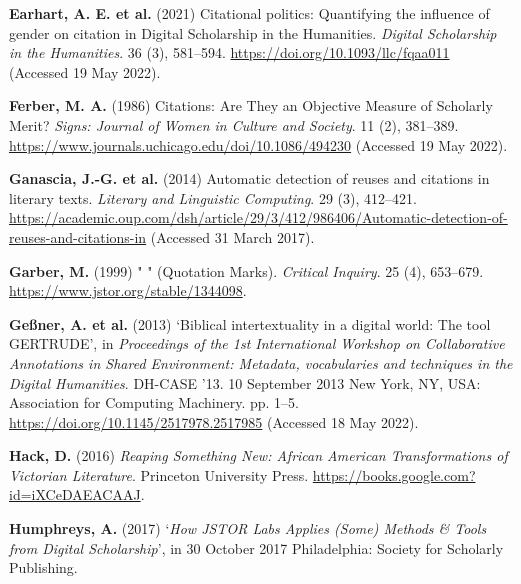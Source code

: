 \documentclass[
]{article}
\newlength{\cslhangindent}
\newlength{\cslentryspacingunit} %
\newenvironment{CSLReferences}[2] %
 {%
  \setlength{\parindent}{0pt}
  \ifodd #1
  \let\oldpar\par
  \def\par{\hangindent=\cslhangindent\oldpar}
  \fi
  \setlength{\parskip}{#2\cslentryspacingunit}
 }%
 {}
\begin{document}
\begin{CSLReferences}{1}{0}
\leavevmode{}%
\textbf{Earhart, A. E. et al.} (2021) Citational politics: {Quantifying}
the influence of gender on citation in {Digital Scholarship} in the
{Humanities}. \emph{Digital Scholarship in the Humanities}. 36 (3),
581--594. \url{https://doi.org/10.1093/llc/fqaa011} (Accessed 19 May
2022).

\leavevmode{}%
\textbf{Ferber, M. A.} (1986) Citations: {Are They} an {Objective
Measure} of {Scholarly Merit}? \emph{Signs: Journal of Women in Culture
and Society}. 11 (2), 381--389.
\url{https://www.journals.uchicago.edu/doi/10.1086/494230} (Accessed 19
May 2022).

\leavevmode{}%
\textbf{Ganascia, J.-G. et al.} (2014) Automatic detection of reuses and
citations in literary texts. \emph{Literary and Linguistic Computing}.
29 (3), 412--421.
\url{https://academic.oup.com/dsh/article/29/3/412/986406/Automatic-detection-of-reuses-and-citations-in}
(Accessed 31 March 2017).

\leavevmode{}%
\textbf{Garber, M.} (1999) " " ({Quotation Marks}). \emph{Critical
Inquiry}. 25 (4), 653--679. \url{https://www.jstor.org/stable/1344098}.

\leavevmode{}%
\textbf{Geßner, A. et al.} (2013) {`Biblical intertextuality in a
digital world: The tool {GERTRUDE}'}, in \emph{Proceedings of the 1st
{International Workshop} on {Collaborative Annotations} in {Shared
Environment}: Metadata, vocabularies and techniques in the {Digital
Humanities}}. {DH-CASE} '13. 10 September 2013 {New York, NY, USA}:
{Association for Computing Machinery}. pp. 1--5.
\url{https://doi.org/10.1145/2517978.2517985} (Accessed 18 May 2022).

\leavevmode{}%
\textbf{Hack, D.} (2016) \emph{Reaping {Something New}: {African
American Transformations} of {Victorian Literature}}. {Princeton
University Press}. \url{https://books.google.com?id=iXCeDAEACAAJ}.

\leavevmode{}%
\textbf{Humphreys, A.} (2017) {`\emph{How {JSTOR Labs Applies} ({Some})
{Methods} \& {Tools} from {Digital Scholarship}}'}, in 30 October 2017
{Philadelphia}: Society for Scholarly Publishing.


\end{CSLReferences}
\end{document}
